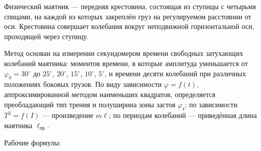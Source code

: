 \documentclass[11pt,a4paper]{article}
\newcommand{\sect}[1]{\par\vspace{10pt}{\large #1}\par\vspace{4pt}}
\newcommand{\gr}{\ensuremath{^\circ}}
\newcommand{\sub}[1]{\text{#1}}
\begin{document}
\sect{3. Объект исследования.}
Физический маятник — передняя крестовина, состоящая из ступицы с четырьмя спицами, на каждой из которых
закреплён груз на регулируемом расстоянии от оси. Крестовина совершает колебания вокруг неподвижной
горизонтальной оси, проходящей через ступицу. 

\sect{4. Метод экспериментального исследования.}
Метод основан на измерении секундомером времени свободных затухающих колебаний маятника: моментов времени,
в которые амплитуда уменьшается от $\varphi_0=30\gr$ до $25\gr$, $20\gr$, $15\gr$, $10\gr$, $5\gr$, и времени десяти
колебаний при различных положениях боковых грузов. По виду зависимости $\varphi=f(t)$, аппроксимированной
методом наименьших квадратов, определяется преобладающий тип трения и полуширина зоны застоя $\varphi_\sub{з}$;
по зависимости $T^2=f(I)$ — произведение $m\ell$; по периодам колебаний — приведённая длина маятника $\ell_\sub{пр}$.

\sect{5. Рабочие формулы и исходные данные.}
Рабочие формулы:
\end{document}
